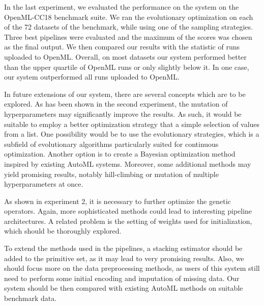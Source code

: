 In the last experiment, we evaluated the performance on the system on the OpenML-CC18 benchmark suite.
We ran the evolutionary optimization on each of the 72 datasets of the
benchmark, while using one of the sampling strategies. Three best pipelines were evaluated
and the maximum of the scores was chosen as the final output. We then compared our
results with the statistic of runs uploaded to OpenML. Overall, on most datasets
our system performed better than the upper quartile of OpenML runs or only slightly
below it. In one case, our system outperformed all runs uploaded to OpenML.

In future extensions of our system, there are several concepts which are to be
explored. As has been shown in the second experiment, the mutation of hyperparameters
may significantly improve the results. As such, it would be suitable to employ a
better optimization strategy that a simple selection of values from a list. One
possibility would be to use the evolutionary strategies, which is a subfield of
evolutionary algorithms particularly suited for continuous optimization. Another
option is to create a Bayesian optimization method inspired by existing AutoML
systems. Moreover, some additional methods may yield promising results, notably
hill-climbing or mutation of multiple hyperparameters at once.

As shown in experiment 2, it is necessary to further optimize the genetic operators.
Again, more sophisticated methods could lead to interesting pipeline architectures.
A related problem is the setting of weights used for initialization, which should be
thoroughly explored.

To extend the methods used in the pipelines, a stacking estimator should be added
to the primitive set, as it may lead to very promising results. Also, we should focus
more on the data preprocessing methods, as users of this system still need to perform
some initial encoding and imputation of missing data. Our system should be then
compared with existing AutoML methods on suitable benchmark data.




